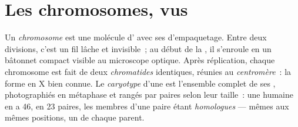 \section{Les chromosomes, vus}

\begin{definition}\label{def:g11:cell-cycle-mitosis:chromosome}
Un \emph{chromosome} est une molécule d' avec ses 
d'empaquetage. Entre deux divisions, c'est un fil lâche et invisible~;
au début de la , il s'enroule en un bâtonnet compact visible au
microscope optique. Après réplication, chaque chromosome est fait de
deux \emph{chromatides} identiques, réunies au
\emph{centromère}~: la forme en X bien connue. Le
\emph{caryotype} d'une  est l'ensemble complet
de ses , photographiés en métaphase et rangés par paires
selon leur taille~: une  humaine en a 46, en 23 paires, les
membres d'une paire étant \emph{homologues} --- mêmes  aux mêmes
positions, un de chaque parent.
\end{definition}

